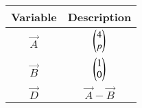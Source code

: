 \begin{tabular}[15pt]{ |c| c|}
    \hline
    \textbf{Variable} & \textbf{Description}\\ 
    \hline
    $\vec{A}$ & $\begin{pmatrix}4\\p\end{pmatrix}$ \\
    \hline 
    $\vec{B}$ & $\begin{pmatrix}1\\0\end{pmatrix}$ \\
	\hline
    $\vec{D}$ & $\vec{A}-\vec{B}$\\
    \hline 
    \end{tabular}
